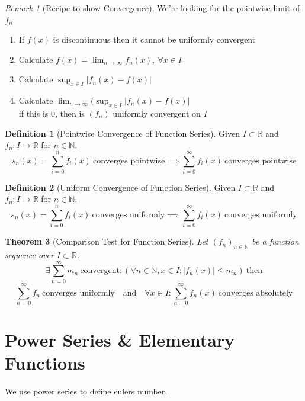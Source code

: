 \documentclass[english,titlepage]{uzhpub}
\theoremstyle{definition}
\newtheorem{definition}{Definition}[section]
\theoremstyle{plain}
\newtheorem{theorem}[definition]{Theorem} %
\theoremstyle{remark}
\newtheorem*{remark}{Remark}
\theoremstyle{example}
\begin{document}
   \begin{remark}[Recipe to show Convergence]
      We're looking for the pointwise limit of \(f_n\).
      \begin{enumerate}
         \item If \(f(x)\) is discontinuous then it cannot be uniformly convergent
         \item Calculate \(f(x) = \lim_{n \to \infty} f_n(x),~\forall x \in I\)
         \item Calculate \(\sup_{x \in I} |f_n(x) - f(x)|\)
         \item Calculate \(\lim_{n \to \infty} (\sup_{x \in I} |f_n(x) - f(x)|\)\\
            if this is 0, then is \((f_n)\) uniformly convergent on \(I\)
      \end{enumerate}
   \end{remark}

   \begin{definition}[Pointwise Convergence of Function Series]
      Given \(I \subset \mathbb{R}\) and \(f_n: I \to \mathbb{R}\) for \(n \in \mathbb{N}\).
      \[s_n(x) = \sum_{i=0}^n f_i(x)~\text{converges pointwise} \implies \sum_{i = 0}^\infty f_i(x)~\text{converges pointwise}\]
   \end{definition}

   \begin{definition}[Uniform Convergence of Function Series]
      Given \(I \subset \mathbb{R}\) and \(f_n: I \to \mathbb{R}\) for \(n \in \mathbb{N}\).
      \[s_n(x) = \sum_{i=0}^n f_i(x)~\text{converges uniformly} \implies \sum_{i = 0}^\infty f_i(x)~\text{converges uniformly}\]
   \end{definition}

   \begin{theorem}[Comparison Test for Function Series]\label{thm:maj_func_ser}
      Let \((f_n)_{n \in \mathbb{N}}\) be a function sequence over \(I \subset \mathbb{R}\).
      \[\exists \sum_{n=0}^\infty m_n~\text{convergent}: (\forall n \in \mathbb{N}, x \in I: |f_n(x)| \leq m_n)~\text{then}\]
      \[\sum_{n = 0}^\infty f_n~\text{converges uniformly} \quad\text{and}\quad \forall x \in I: \sum_{n = 0}^\infty f_n(x)~\text{converges absolutely}\]
   \end{theorem}

   \section{Power Series \& Elementary Functions}
   We use power series to define eulers number.
\end{document}
